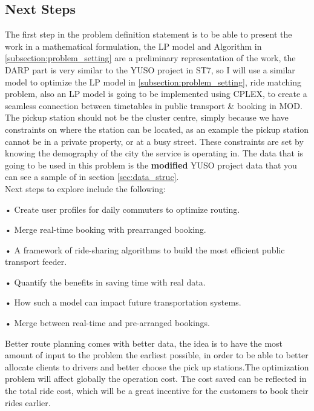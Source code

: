 \documentclass{article}
\begin{document}
\subsection{Next Steps}
\label{subsec:next_steps}
The first step in the problem definition statement is to be able to present the work in a mathematical formulation, the LP model and Algorithm in \ref{subsection:problem_setting}  are a preliminary representation of the work, the DARP part is very similar to the YUSO project in ST7, so I will use a similar model to optimize the LP model in \ref{subsection:problem_setting}, ride matching problem, also an LP model is going to be implemented using CPLEX, to create a seamless connection between timetables in public transport \& booking in MOD. The pickup station should not be the cluster centre, simply because we have constraints on where the station can be located, as an example the pickup station cannot be in a private property, or at a busy street.
These constraints are set by knowing the demography of the city the service is operating in. The data that is going to be used in this problem is the \textbf{modified} YUSO project data that you can see a sample of in section \ref{sec:data_struc}. \\


Next steps to explore include the following:
\begin{list}{}
\item • Create user profiles for daily commuters to optimize routing.
\item • Merge real-time booking with prearranged booking.
\item • A framework of ride-sharing algorithms to build the most efficient public transport feeder.
\item • Quantify the benefits in saving time with real data. 
\item •  How such a model can impact future transportation systems.
\item •  Merge between real-time and pre-arranged bookings.
\end{list}

Better route planning comes with better data, the idea is to have the most amount of input to the problem the earliest possible, in order to be able to better allocate clients to drivers and better choose the pick up stations.The optimization problem will affect globally the operation cost. The cost saved can be reflected in the total ride cost, which will be a great incentive for the customers to book their rides earlier.
\end{document}
